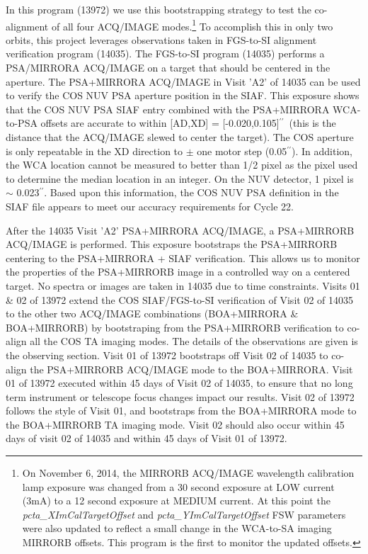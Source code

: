 \documentclass[12pt]{reportj}
\def\arcsec{\hbox{$^{\prime\prime}$}}
\begin{document}
In this program (13972) we use this bootstrapping strategy to test the co-alignment of all four ACQ/IMAGE modes.\footnote{On November 6, 2014,
the MIRRORB ACQ/IMAGE wavelength calibration lamp exposure was changed from a 30 second exposure
at LOW current (3mA) to a 12 second exposure at MEDIUM current. At this point the {\it pcta\_XImCalTargetOffset} and {\it pcta\_YImCalTargetOffset}
FSW parameters were also updated to reflect a small change in the WCA-to-SA imaging MIRRORB offsets. This program is the first
to monitor the updated offsets.}
To accomplish this in only two orbits, this project leverages observations taken in FGS-to-SI alignment verification
program (14035).
\clearpage
The FGS-to-SI program (14035) performs a PSA/MIRRORA ACQ/IMAGE on a target that should be centered in the aperture.
The PSA+MIRRORA ACQ/IMAGE in Visit 'A2' of 14035 can be used to verify the COS NUV PSA aperture position in the SIAF.
This exposure shows that the COS NUV PSA SIAF entry combined with the PSA+MIRRORA WCA-to-PSA offsets are
accurate to within [AD,XD] = [-0.020,0.105]\arcsec\ (this is the distance that the ACQ/IMAGE slewed to center the target).
The COS aperture is only repeatable in the XD direction to $\pm$ one motor step (0.05\arcsec). In addition, the WCA location
cannot be measured to better than 1/2 pixel as the pixel used to determine the median location in an integer.
On the NUV detector, 1 pixel is $\sim$ 0.023\arcsec. Based upon this information, the COS NUV PSA definition
in the SIAF file appears to meet our accuracy requirements for Cycle 22.

After the 14035 Visit 'A2' PSA+MIRRORA ACQ/IMAGE, a PSA+MIRRORB ACQ/IMAGE is performed.
This exposure bootstraps the PSA+MIRRORB centering to the PSA+MIRRORA + SIAF verification.
This allows us to monitor the properties of the PSA+MIRRORB image in a controlled way on a centered target. No spectra or images are taken in 14035 due to time constraints.
Visits 01 \& 02 of 13972 extend the COS SIAF/FGS-to-SI verification of Visit 02 of 14035 to the other two ACQ/IMAGE combinations (BOA+MIRRORA \& BOA+MIRRORB) by bootstraping from the PSA+MIRRORB verification to co-align all the COS TA imaging modes. The details of the observations are given is the observing section.
Visit 01 of 13972 bootstraps off Visit 02 of 14035 to co-align the PSA+MIRRORB ACQ/IMAGE mode to the BOA+MIRRORA. Visit 01 of 13972 executed within 45 days of Visit 02 of 14035, to ensure that no long term instrument or telescope focus changes impact our results.
Visit 02 of 13972 follows the style of Visit 01, and bootstraps from the BOA+MIRRORA mode to the BOA+MIRRORB TA imaging mode. Visit 02 should also occur within 45 days of visit 02 of 14035 and within 45 days of Visit 01 of 13972.
\end{document}
